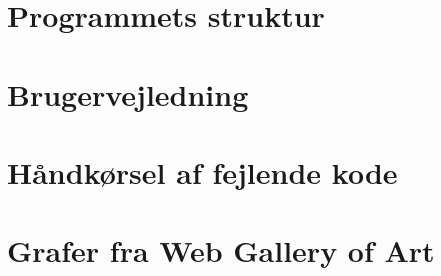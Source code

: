 {

\chapter{Programmets struktur\label{appendix_struktur}}


\chapter{Brugervejledning\label{appendix_vejledning}}


\chapter{Håndkørsel af fejlende kode\label{appendix_bug}}


\chapter{Grafer fra Web Gallery of Art\label{appendix_grafer}}



}

